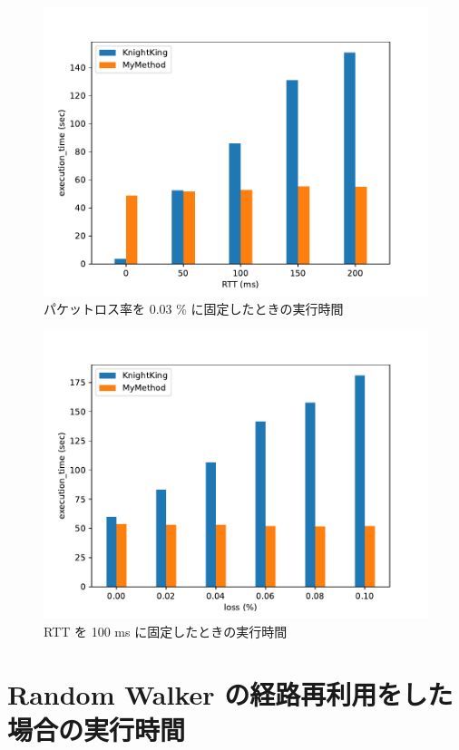\begin{figure}[t]
    \centering
    \includegraphics[scale=0.8]{figure/Kn_vs_AR_RTT.pdf}
    \caption{パケットロス率を 0.03 \% に固定したときの実行時間}
    \label{パケットロス率を 0.03 に固定したときの実行時間}
\end{figure}

\begin{figure}[t!]
    \centering
    \includegraphics[scale=0.8]{figure/Kn_vs_AR_loss.pdf}
    \caption{RTT を 100 ms に固定したときの実行時間}
    \label{RTT を 100 ms に固定したときの実行時間}
\end{figure}

\section{Random Walker の経路再利用をした場合の実行時間}\label{Random Walker の経路再利用をした場合の実行時間}

